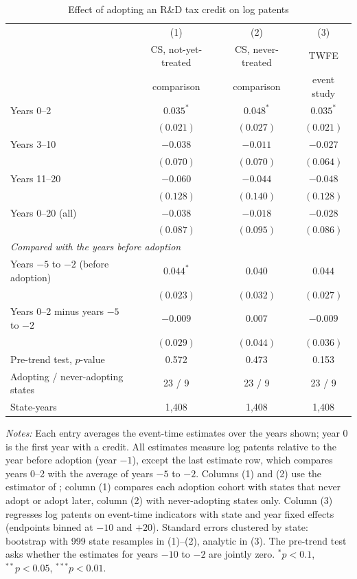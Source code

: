 \begin{table}[t]
\centering
\caption{Effect of adopting an R\&D tax credit on log patents}
\label{tab:main}
\begin{threeparttable}
\begin{tabular}{lccc}
\toprule
 & (1) & (2) & (3) \\
 & CS, not-yet-treated & CS, never-treated & TWFE \\
 & comparison & comparison & event study \\
\midrule
Years 0--2 & $0.035^{*}$ & $0.048^{*}$ & $0.035^{*}$ \\
 & $(0.021)$ & $(0.027)$ & $(0.021)$ \\[2pt]
Years 3--10 & $-0.038$ & $-0.011$ & $-0.027$ \\
 & $(0.070)$ & $(0.070)$ & $(0.064)$ \\[2pt]
Years 11--20 & $-0.060$ & $-0.044$ & $-0.048$ \\
 & $(0.128)$ & $(0.140)$ & $(0.128)$ \\[2pt]
Years 0--20 (all) & $-0.038$ & $-0.018$ & $-0.028$ \\
 & $(0.087)$ & $(0.095)$ & $(0.086)$ \\[2pt]
\midrule
\multicolumn{4}{l}{\textit{Compared with the years before adoption}} \\
Years $-5$ to $-2$ (before adoption) & $0.044^{*}$ & $0.040$ & $0.044$ \\
 & $(0.023)$ & $(0.032)$ & $(0.027)$ \\[2pt]
Years 0--2 minus years $-5$ to $-2$ & $-0.009$ & $0.007$ & $-0.009$ \\
 & $(0.029)$ & $(0.044)$ & $(0.036)$ \\[2pt]
\midrule
Pre-trend test, $p$-value & 0.572 & 0.473 & 0.153 \\
\midrule
Adopting / never-adopting states & 23 / 9 & 23 / 9 & 23 / 9 \\
State-years & 1,408 & 1,408 & 1,408 \\
\bottomrule
\end{tabular}
\begin{tablenotes}[flushleft]\footnotesize
\item \textit{Notes:} Each entry averages the event-time estimates over the years shown; year 0 is
the first year with a credit. All estimates measure log patents relative to the year before adoption
(year $-1$), except the last estimate row, which compares years 0--2 with the average of years $-5$ to $-2$.
Columns (1) and (2) use the estimator of \citet{callaway2021difference}; column (1) compares each
adoption cohort with states that never adopt or adopt later, column (2) with never-adopting states only.
Column (3) regresses log patents on event-time indicators with state and year fixed effects (endpoints
binned at $-10$ and $+20$). Standard errors clustered by state: bootstrap with 999 state resamples in
(1)--(2), analytic in (3). The pre-trend test asks whether the estimates for years $-10$ to $-2$ are jointly
zero. $^{*}p<0.1$, $^{**}p<0.05$, $^{***}p<0.01$.
\end{tablenotes}
\end{threeparttable}
\end{table}
